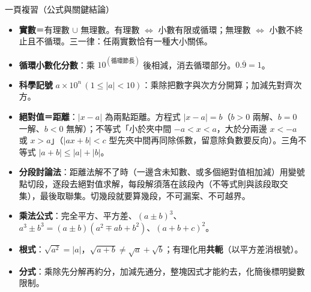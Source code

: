 \documentclass[11pt]{article}
\begin{document}
\begin{補充框}{一頁複習（公式與關鍵結論）}
\begin{itemize}\setlength{\itemsep}{2pt}
\item \textbf{實數}＝有理數 $\cup$ 無理數。有理數 $\iff$ 小數有限或循環；無理數 $\iff$ 小數不終止且不循環。三一律：任兩實數恰有一種大小關係。
\item \textbf{循環小數化分數}：乘 $10^{(\text{循環節長})}$ 後相減，消去循環部分。$0.\overline{9}=1$。
\item \textbf{科學記號} $a\times10^n\,(1\le|a|<10)$：乘除把數字與次方分開算；加減先對齊次方。
\item \textbf{絕對值＝距離}：$|x-a|$ 為兩點距離。方程式 $|x-a|=b$（$b>0$ 兩解、$b=0$ 一解、$b<0$ 無解）；不等式「小於夾中間 $-a<x<a$，大於分兩邊 $x<-a$ 或 $x>a$」（$|ax+b|<c$ 型先夾中間再同除係數，留意除負數要反向）。三角不等式 $|a+b|\le|a|+|b|$。
\item \textbf{分段討論法}：距離法解不了時（一邊含未知數、或多個絕對值相加減）用變號點切段，逐段去絕對值求解，每段解須落在該段內（不等式則與該段取交集），最後取聯集。切幾段就要算幾段，不可漏案、不可越界。
\item \textbf{乘法公式}：完全平方、平方差、$(a\pm b)^3$、$a^3\pm b^3=(a\pm b)(a^2\mp ab+b^2)$、$(a+b+c)^2$。
\item \textbf{根式}：$\sqrt{a^2}=|a|$，$\sqrt{a+b}\ne\sqrt a+\sqrt b$；有理化用\textbf{共軛}（以平方差消根號）。
\item \textbf{分式}：乘除先分解再約分，加減先通分，整塊因式才能約去，化簡後標明變數限制。
\end{itemize}
\end{補充框}
\end{document}
